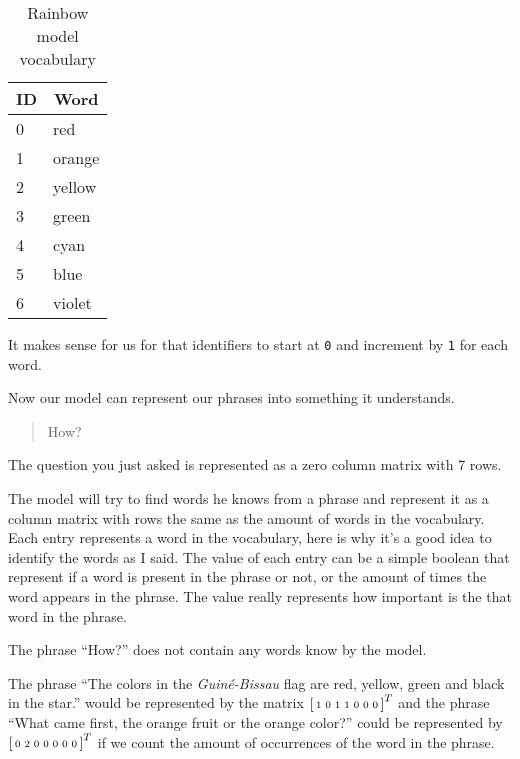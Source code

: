 \documentclass[a4paper,12pt]{article}
\theoremstyle{mytheoremstyle}
\theoremstyle{mytheoremstyle}
\theoremstyle{myproblemstyle}
\begin{document}
    \begin{table}
        \caption{Rainbow model vocabulary}\label{tab:rainbow_model_vocab}
        \begin{center}
            \begin{tabular}[c]{l|l}
                \hline
                \multicolumn{1}{c|}{\textbf{ID}} &
                \multicolumn{1}{c}{\textbf{Word}} \\
                \hline
                0 & red \\
                1 & orange \\
                2 & yellow \\
                3 & green \\
                4 & cyan \\
                5 & blue \\
                6 & violet \\

                \hline
            \end{tabular}
        \end{center}
    \end{table}

    It makes sense for us for that identifiers to start at \texttt{0} and
    increment by \texttt{1} for each word.

    Now our model can represent our phrases into something it understands.

    \begin{quote}
        How?
    \end{quote}

    The question you just asked is represented as a zero column matrix with 7
    rows.

    The model will try to find words he knows from a phrase and represent it as
    a column matrix with rows the same as the amount of words in the vocabulary.
    Each entry represents a word in the vocabulary, here is why it's a good
    idea to identify the words as I said. The value of each entry can be a
    simple boolean that represent if a word is present in the phrase or not, or
    the amount of times the word appears in the phrase. The value really
    represents how important is the that word in the phrase.

    The phrase ``How?'' does not contain any words know by the model.

    The phrase ``The colors in the \textit{Guiné-Bissau} flag are red, yellow,
    green and black in the star.'' would be represented by the matrix
    $\begin{bsmallmatrix}1&0&1&1&0&0&0\end{bsmallmatrix}^T$ and the phrase
    ``What came first, the orange fruit or the orange color?'' could be
    represented by $\begin{bsmallmatrix}0&2&0&0&0&0&0\end{bsmallmatrix}^T$ if
    we count the amount of occurrences of the word in the phrase.
\end{document}
